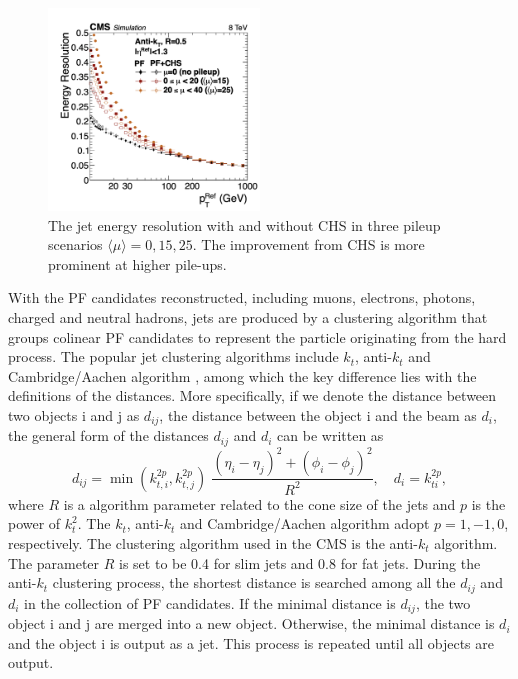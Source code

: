 \begin{figure}[ht]
    \centering
    \includegraphics[width=0.5\textwidth]{chapters/CMSExperiment/sectionReconstruction/figures/jetres_pf_chs}
    \caption{ The jet energy resolution \cite{cms:particleflow:Sirunyan:2017ulk} with and without CHS in three pileup scenarios $\langle \mu\rangle =0,15,25$. The improvement from CHS is more prominent at higher pile-ups.  }
    \label{fig:cmsexperiment:reconstruction:resJet}
\end{figure}



With the PF candidates reconstructed, including muons, electrons, photons, charged and neutral hadrons, jets are produced by a clustering algorithm that groups colinear PF candidates to represent the particle originating from the hard process. The popular jet clustering algorithms include $k_t$, anti-$k_t$ and Cambridge/Aachen algorithm \cite{tech:antikt:Cacciari:2008gp}, among which the key difference lies with the definitions of the distances. More specifically, if we denote the distance between two objects i and j as $d_{ij}$, the distance between the object i and the beam as $d_i$,  the general form of the distances $d_{ij}$ and $d_i$ can be written as
\begin{equation}
	d_{ij} = \min(k_{t,i}^{2p}, k_{t,j}^{2p}) \; \frac{(\eta_i-\eta_j) ^2 + (\phi_i-\phi_j) ^2}{R^2} , \quad d_i =k_{ti}^{2p},
\end{equation}
\noindent where $R$ is a algorithm parameter related to the cone size of the jets and $p$ is the power of $k_t^2$. The $k_t$, anti-$k_t$ and Cambridge/Aachen algorithm adopt $p=1,-1,0$, respectively. The clustering algorithm used in the CMS is the anti-$k_t$ algorithm. The parameter $R$ is set to be 0.4 for slim jets and 0.8 for fat jets. During the anti-$k_t$ clustering process, the shortest distance is searched among all the $d_{ij}$ and $d_i$ in the collection of PF candidates. If the minimal distance is $d_{ij}$, the two object i and j are merged into a new object. Otherwise, the minimal distance is $d_{i}$ and the object i is output as a jet. This process is repeated until all objects are output. 

